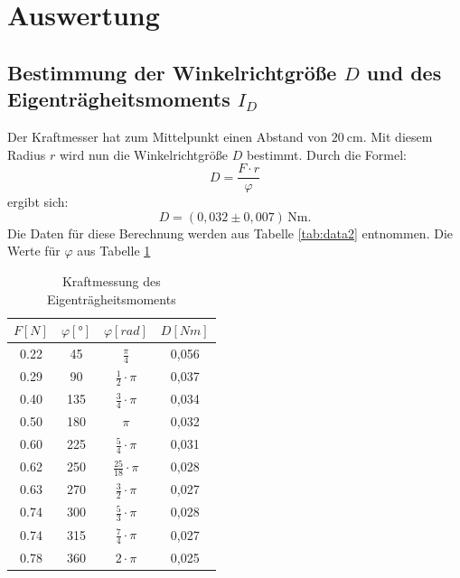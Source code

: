 
\section{Auswertung}
\subsection{Bestimmung der Winkelrichtgröße $D$ und des Eigenträgheitsmoments $I_D$}

Der Kraftmesser hat zum Mittelpunkt einen Abstand von $\SI{20}{\centi\meter}$.
Mit diesem Radius $r$ wird nun die Winkelrichtgröße $D$ bestimmt.
Durch die Formel:
\begin{equation}
  D = \frac{F\cdot r}{\varphi}
\end{equation}
ergibt sich:
\begin{equation*}
 D = (0,032 \pm 0,007)\, \mathrm{Nm}.
\end{equation*}
Die Daten für diese Berechnung werden aus Tabelle \ref{tab:data2} entnommen.
Die Werte für $\varphi$ aus Tabelle \ref{tab:phi}

\begin{table}[H]
  \centering
  \caption{Kraftmessung des Eigenträgheitsmoments}
  \label{tab:phi}
  \begin{tabular}{c c c c}
    \toprule
    $F[N]$ & $\varphi[°]$ & $\varphi[rad]$ & $D[Nm]$\\
    \midrule
     0.22 & 45 & $\frac{\pi}{4}$ & 0,056 \\
     0.29 & 90 & $\frac{1}{2} \cdot \pi$ & 0,037 \\
     0.40 & 135 & $\frac{3}{4} \cdot \pi$ & 0,034 \\
     0.50 & 180 & $\pi$ & 0,032 \\
     0.60 & 225 & $\frac{5}{4} \cdot \pi$ & 0,031 \\
     0.62 & 250 & $\frac{25}{18} \cdot \pi$ & 0,028 \\
     0.63 & 270 & $\frac{3}{2} \cdot \pi$ & 0,027 \\
     0.74 & 300 & $\frac{5}{3} \cdot \pi$ & 0,028 \\
     0.74 & 315 & $\frac{7}{4} \cdot \pi$ & 0,027\\
     0.78 & 360 & $2 \cdot \pi$ & 0,025\\
    \bottomrule
  \end{tabular}
\end{table}

